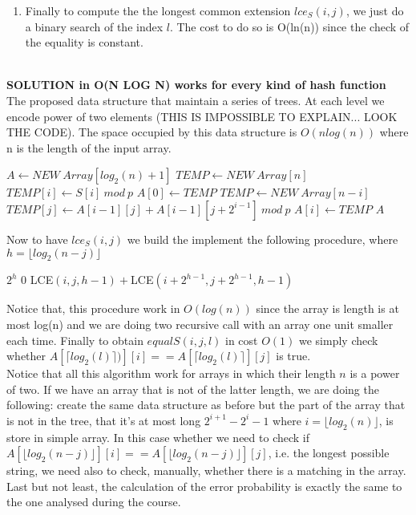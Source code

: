 \documentclass[a4paper]{article}
\begin{document}
\begin{enumerate}
\item Finally to compute the the longest common extension $lce_S(i, j)$, we just do a binary search of the index $l$. The cost to do so is O(ln(n)) since the check of the equality is constant.
\end{enumerate}

\newpage \qquad \\
\textbf{SOLUTION in O(N LOG N) works for every kind of hash function}
\\
The proposed data structure that maintain a series of trees. At each level we encode power of two elements (THIS IS IMPOSSIBLE TO EXPLAIN... LOOK THE CODE). The space occupied by this data structure is $O(nlog(n))$ where n is the length of the input array.   
\begin{algorithmic}
\State $A \gets NEW \ Array[log_2(n)+1]$
\State $TEMP \gets NEW \ Array[n]$
\State $TEMP[i] \gets S[i] \ mod \ p$
\EndFor 
\State $A[0] \gets TEMP$
\State $TEMP \gets NEW \ Array[n-i]$ 
\State $TEMP[j] \gets A[i-1][j] + A[i-1][j+2^{i-1}] \ mod \ p$
\EndFor 
\State $A[i] \gets TEMP$
\EndFor 
\State \Return $A$
\EndFunction
\end{algorithmic}
Now to have $lce_S(i, j)$ we build the implement the following procedure, where $h=\lfloor log_2(n-j)\rfloor$
\begin{algorithmic}
    \State \Return $2^h$
\Else
        \State \Return $0$
    \Else
    	\State \Return LCE$(i, j,h-1) +$LCE$(i+2^{h-1},j+2^{h-1},h-1)$ 
    \EndIf
\EndIf
\EndFunction
\end{algorithmic}
Notice that, this procedure work in $O(log(n))$ since the array is length is at most log(n) and we are doing two recursive call with an array one unit smaller each time. Finally to obtain $equalS(i, j,\textit{l})$ in cost $O(1)$ we simply check whether $A[\lceil log_2(l) \rceil )][i]== A[\lceil log_2(l) \rceil ][j]$ is true. \\
Notice that all this algorithm work for arrays in which their length $n$ is a power of two. If we have an array that is not of the latter length, we are doing the following: create the same data structure as before but the part of the array that is not in the tree, that it's at most long $2^{i+1}-2^{i}-1$ where $i= \lfloor log_2(n)\rfloor$, is store in simple array. In this case whether we need to check if $A[\lfloor log_2(n-j)\rfloor][i]== A[\lfloor log_2(n-j)\rfloor][j]$, i.e. the longest possible string, we need also to check, manually, whether there is a matching in the array. Last but not least, the calculation of the error probability is exactly the same to the one analysed during the course.  
\end{document}
